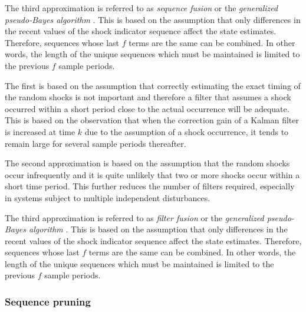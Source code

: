 The third approximation is referred to as \textit{sequence fusion} or the \textit{generalized pseudo-Bayes algorithm} \citep{jaffer_estimation_1971, buxbaum_recursive_1970, tugnait_detection_1982}. This is based on the assumption that only differences in the recent values of the shock indicator sequence affect the state estimates. Therefore, sequences whose last $f$ terms are the same can be combined. In other words, the length of the unique sequences which must be maintained is limited to the previous $f$ sample periods.

The first is based on the assumption that correctly estimating the exact timing of the random shocks is not important and therefore a filter that assumes a shock occurred within a short period close to the actual occurrence will be adequate. This is based on the observation that when the correction gain of a Kalman filter is increased at time $k$ due to the assumption of a shock occurrence, it tends to remain large for several sample periods thereafter.

The second approximation is based on the assumption that the random shocks occur infrequently and it is quite unlikely that two or more shocks occur within a short time period. This further reduces the number of filters required, especially in systems subject to multiple independent disturbances.

The third approximation is referred to as \textit{filter fusion} or the \textit{generalized pseudo-Bayes algorithm} \cite{jaffer_estimation_1971, buxbaum_recursive_1970, tugnait_detection_1982}. This is based on the assumption that only differences in the recent values of the shock indicator sequence affect the state estimates. Therefore, sequences whose last $f$ terms are the same can be combined. In other words, the length of the unique sequences which must be maintained is limited to the previous $f$ sample periods.

\subsubsection{Sequence pruning} \label{subsec-pruning}

